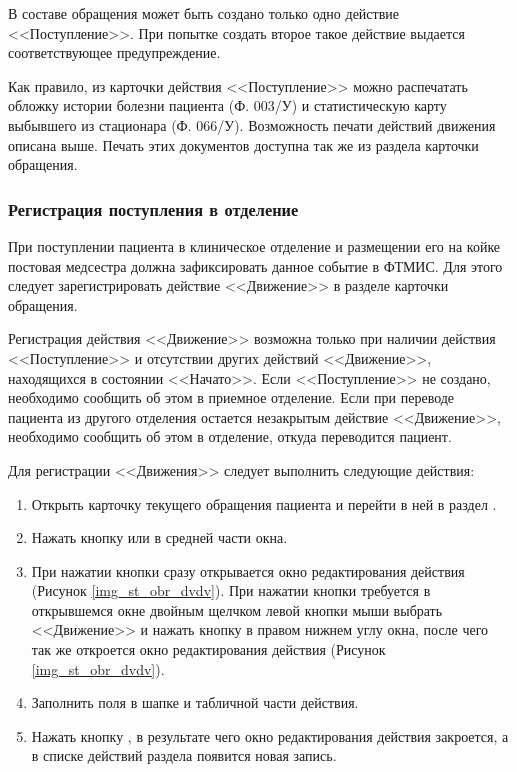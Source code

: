 \begin{vnim}
 В составе обращения может быть создано только одно действие <<Поступление>>. При попытке создать второе такое действие выдается соответствующее предупреждение.
\end{vnim}
 
Как правило, из карточки действия <<Поступление>> можно распечатать обложку истории болезни пациента (Ф. 003/У) и статистическую карту выбывшего из стационара (Ф. 066/У). Возможность печати действий движения описана выше. Печать этих документов доступна так же из раздела  карточки обращения.

\subsubsection{Регистрация поступления в отделение} \label{st_obr_dvdv}

При поступлении пациента в клиническое отделение и размещении его на койке постовая медсестра должна зафиксировать данное событие в ФТМИС. Для этого следует зарегистрировать действие <<Движение>> в разделе  карточки обращения.

\begin{vnim}
 Регистрация действия <<Движение>> возможна только при наличии действия <<Поступление>> и отсутствии других действий <<Движение>>, находящихся в состоянии <<Начато>>. Если <<Поступление>> не создано, необходимо сообщить об этом в приемное отделение. Если при переводе пациента из другого отделения остается незакрытым действие <<Движение>>, необходимо сообщить об этом в отделение, откуда переводится пациент.
\end{vnim}
 
Для регистрации <<Движения>> следует выполнить следующие действия:
\begin{enumerate}
 \item Открыть карточку текущего обращения пациента и перейти в ней в раздел .
 \item Нажать кнопку  или  в средней части окна.
 \item При нажатии кнопки  сразу открывается окно редактирования действия (Рисунок \ref{img_st_obr_dvdv}). При нажатии кнопки  требуется в открывшемся окне двойным щелчком левой кнопки мыши выбрать <<Движение>> и нажать кнопку  в правом нижнем углу окна, после чего так же откроется окно редактирования действия (Рисунок \ref{img_st_obr_dvdv}).
 \item Заполнить поля в шапке и табличной части действия.
 \item Нажать кнопку , в результате чего окно редактирования действия закроется, а в списке действий раздела  появится новая запись.
\end{enumerate}

